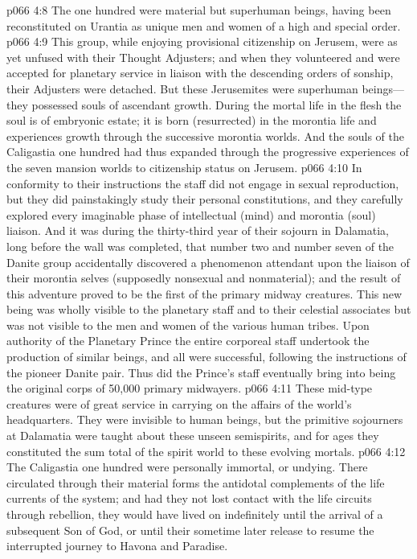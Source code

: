 \pc \vs p066 4:8 \bibnobreakspace The one hundred were material but superhuman beings, having been reconstituted on Urantia as unique men and women of a high and special order.
\vs p066 4:9 This group, while enjoying provisional citizenship on Jerusem, were as yet unfused with their Thought Adjusters; and when they volunteered and were accepted for planetary service in liaison with the descending orders of sonship, their Adjusters were detached. But these Jerusemites were superhuman beings---they possessed souls of ascendant growth. During the mortal life in the flesh the soul is of embryonic estate; it is born (resurrected) in the morontia life and experiences growth through the successive morontia worlds. And the souls of the Caligastia one hundred had thus expanded through the progressive experiences of the seven mansion worlds to citizenship status on Jerusem.
\vs p066 4:10 In conformity to their instructions the staff did not engage in sexual reproduction, but they did painstakingly study their personal constitutions, and they carefully explored every imaginable phase of intellectual (mind) and morontia (soul) liaison. And it was during the thirty\hyp{}third year of their sojourn in Dalamatia, long before the wall was completed, that number two and number seven of the Danite group accidentally discovered a phenomenon attendant upon the liaison of their morontia selves (supposedly nonsexual and nonmaterial); and the result of this adventure proved to be the first of the primary midway creatures. This new being was wholly visible to the planetary staff and to their celestial associates but was not visible to the men and women of the various human tribes. Upon authority of the Planetary Prince the entire corporeal staff undertook the production of similar beings, and all were successful, following the instructions of the pioneer Danite pair. Thus did the Prince’s staff eventually bring into being the original corps of 50,000 primary midwayers.
\vs p066 4:11 These mid\hyp{}type creatures were of great service in carrying on the affairs of the world’s headquarters. They were invisible to human beings, but the primitive sojourners at Dalamatia were taught about these unseen semispirits, and for ages they constituted the sum total of the spirit world to these evolving mortals.
\pc \vs p066 4:12 \bibnobreakspace The Caligastia one hundred were personally immortal, or undying. There circulated through their material forms the antidotal complements of the life currents of the system; and had they not lost contact with the life circuits through rebellion, they would have lived on indefinitely until the arrival of a subsequent Son of God, or until their sometime later release to resume the interrupted journey to Havona and Paradise.
